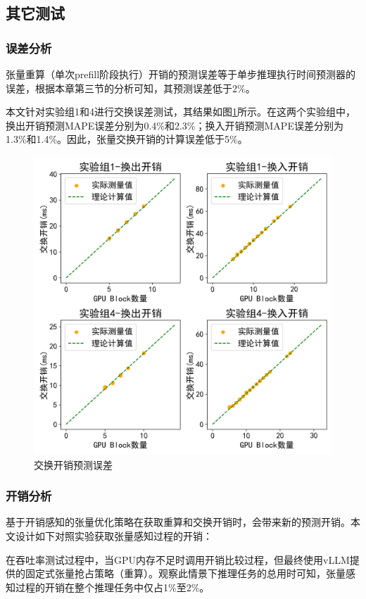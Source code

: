 \documentclass[a4paper, nosysfonts]{hpcchina}
\begin{document}
\subsection{其它测试}
\subsubsection{误差分析}
张量重算（单次prefill阶段执行）开销的预测误差等于单步推理执行时间预测器的误差，根据本章第三节的分析可知，其预测误差低于2\%。 \par
本文针对实验组1和4进行交换误差测试，其结果如图\ref{交换开销预测误差}所示。在这两个实验组中，换出开销预测MAPE误差分别为0.4\%和2.3\%；换入开销预测MAPE误差分别为1.3\%和1.4\%。因此，张量交换开销的计算误差低于5\%。
\begin{figure}[!htbp]
  \centering
  \includegraphics[width=0.9\linewidth]
  {交换开销预测误差.png}
  \caption{交换开销预测误差}
  \label{交换开销预测误差}
\end{figure}

\subsubsection{开销分析}
基于开销感知的张量优化策略在获取重算和交换开销时，会带来新的预测开销。本文设计如下对照实验获取张量感知过程的开销： \par
在吞吐率测试过程中，当GPU内存不足时调用开销比较过程，但最终使用vLLM提供的固定式张量抢占策略（重算）。观察此情景下推理任务的总用时可知，张量感知过程的开销在整个推理任务中仅占1\%至2\%。
    
\end{document}
